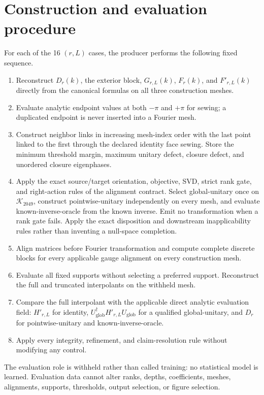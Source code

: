 \documentclass[11pt]{article}
\begin{document}
\section{Construction and evaluation procedure}

For each of the 16 $(r,L)$ cases, the producer performs the following fixed sequence.

\begin{enumerate}
\item Reconstruct $D_r(k)$, the exterior block, $G_{r,L}(k)$, $F_r(k)$, and
$F'_{r,L}(k)$ directly from the canonical formulas on all three construction meshes.
\item Evaluate analytic endpoint values at both $-\pi$ and $+\pi$ for sewing; a duplicated
endpoint is never inserted into a Fourier mesh.
\item Construct neighbor links in increasing mesh-index order with the last point linked to
the first through the declared identity face sewing. Store the minimum threshold
margin, maximum unitary defect, closure defect, and unordered closure eigenphases.
\item Apply the exact source/target orientation, objective, SVD, strict rank gate, and
right-action rules of the alignment contract. Select global-unitary once on $\mathcal K_{2049}$,
construct pointwise-unitary independently on every mesh, and evaluate known-inverse-oracle from the known inverse. Emit no
transformation when a rank gate fails. Apply the exact disposition and downstream
inapplicability rules rather than inventing a null-space completion.
\item Align matrices before Fourier transformation and compute complete discrete blocks for
every applicable gauge alignment on every construction mesh.
\item Evaluate all fixed supports without selecting a preferred support. Reconstruct the
full and truncated interpolants on the withheld mesh.
\item Compare the full interpolant with the applicable direct analytic evaluation field:
$H'_{r,L}$ for identity, $U_{\mathrm{glob}}^\dagger H'_{r,L}U_{\mathrm{glob}}$ for a
qualified global-unitary, and $D_r$ for pointwise-unitary and known-inverse-oracle.
\item Apply every integrity, refinement, and claim-resolution rule without modifying any
control.
\end{enumerate}

The evaluation role is withheld rather than called training: no statistical model is
learned. Evaluation data cannot alter ranks, depths, coefficients, meshes, alignments,
supports, thresholds, output selection, or figure selection.
\end{document}
